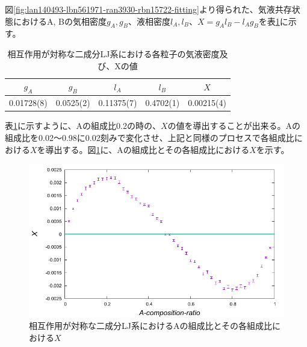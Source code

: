 \documentclass[titlepage]{jsreport}
\begin{document}
\newpage

図\ref{fig:lan140493-lbn561971-ran3930-rbn15722-fitting}より得られた、気液共存状態におけるA, Bの気相密度$g_A, g_B$、液相密度$l_A, l_B$、$X=g_Al_B-l_Ag_B$を表\ref{table:lan140493-lbn561971-ran3930-rbn15722-fitting}に示す。

\begin{table}[htbp]
    \begin{center}
        \caption{相互作用が対称な二成分LJ系における各粒子の気液密度及び、Xの値}
        \label{table:lan140493-lbn561971-ran3930-rbn15722-fitting}
        \begin{tabular}{c c c c c}
            $g_A$ & $g_B$ & $l_A$ & $l_B$ & $X$ \\
            \hline
            0.01728(8)& 0.0525(2) & 0.11375(7) & 0.4702(1) & 0.00215(4) \\
        \end{tabular}
    \end{center}
\end{table}

表\ref{table:lan140493-lbn561971-ran3930-rbn15722-fitting}に示すように、Aの組成比0.2の時の、$X$の値を導出することが出来る。Aの組成比を0.02〜0.98に0.02刻みで変化させ、上記と同様のプロセスで各組成比における$X$を導出する。図\ref{fig:bi-symmetric}に、Aの組成比とその各組成比における$X$を示す。

\begin{figure}[htbp]
    \begin{center}
        \includegraphics[width=14cm]{fig/bi-symmetric/L100T1.0.pdf}
    \end{center}
    \caption{相互作用が対称な二成分LJ系におけるAの組成比とその各組成比における$X$}
    \label{fig:bi-symmetric}
\end{figure}
\end{document}
